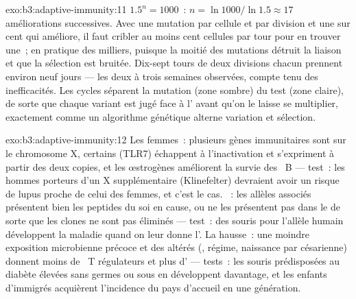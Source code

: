 \begin{solution}{exo:b3:adaptive-immunity:11}
$1.5^{n} = 1000$~: $n = \ln 1000/\ln 1.5 \approx 17$ améliorations
successives. Avec une mutation par cellule et par division et une sur
cent qui améliore, il faut cribler au moins cent cellules par tour pour
en trouver une~; en pratique des milliers, puisque la moitié des
mutations détruit la liaison et que la sélection est bruitée. Dix-sept
tours de deux divisions chacun prennent environ neuf jours --- les deux
à trois semaines observées, compte tenu des inefficacités. Les cycles
séparent la mutation (zone sombre) du test (zone claire), de sorte que
chaque variant est jugé face à l' avant qu'on le laisse se
multiplier, exactement comme un algorithme génétique alterne variation
et sélection.
\end{solution}

\begin{solution}{exo:b3:adaptive-immunity:12}
Les femmes~: plusieurs gènes immunitaires sont sur le chromosome X,
certains (TLR7) échappent à l'inactivation et s'expriment à partir des
deux copies, et les œstrogènes améliorent la survie des ~B
--- test~: les hommes porteurs d'un X supplémentaire (Klinefelter)
devraient avoir un risque de lupus proche de celui des femmes, et c'est
le cas. ~: les allèles associés présentent bien les peptides du soi
en cause, ou ne les présentent pas dans le  de sorte que les
clones ne sont pas éliminés --- test~: des souris  pour
l'allèle humain développent la maladie quand on leur donne l'.
La hausse~: une moindre exposition microbienne précoce et des
 altérés (, régime, naissance par césarienne)
donnent moins de ~T régulateurs et plus d' ---
tests~: les souris prédisposées au diabète élevées sans germes ou sous
 en développent davantage, et les enfants d'immigrés
acquièrent l'incidence du pays d'accueil en une génération.
\end{solution}

